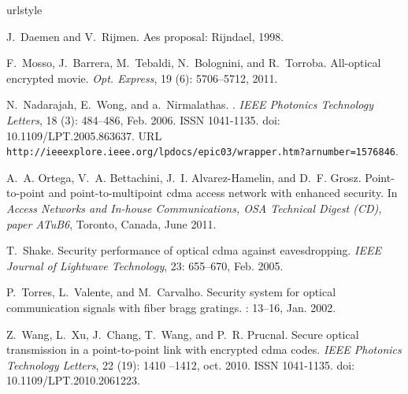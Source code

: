 \documentclass[aspectratio=169]{beamer}
\begin{document}

\footnotesize

\begin{thebibliography}{7}


\providecommand{\natexlab}[1]{#1}
\providecommand{\url}[1]{\texttt{#1}}
\expandafter\ifx\csname urlstyle\endcsname\relax
  \providecommand{\doi}[1]{doi: #1}\else
  \providecommand{\doi}{doi: \begingroup \urlstyle{rm}\Url}\fi

 J.~Daemen and V.~Rijmen.
\newblock Aes proposal: Rijndael, 1998.

F.~Mosso, J.~Barrera, M.~Tebaldi, N.~Bolognini, and R.~Torroba.
\newblock All-optical encrypted movie.
\newblock \emph{Opt. Express}, 19 (6): 5706--5712, 2011.

N.~Nadarajah, E.~Wong, and a.~Nirmalathas.
.
\newblock \emph{IEEE Photonics Technology Letters}, 18 (3):
  484--486, Feb. 2006.
\newblock ISSN 1041-1135.
\newblock \doi{10.1109/LPT.2005.863637}.
\newblock URL
  \url{http://ieeexplore.ieee.org/lpdocs/epic03/wrapper.htm?arnumber=1576846}.

A.~A. Ortega, V.~A. Bettachini, J.~I. Alvarez-Hamelin, and D.~F. Grosz.
\newblock Point-to-point and point-to-multipoint cdma access network with
  enhanced security.
\newblock In \emph{Access Networks and In-house Communications, OSA Technical
  Digest (CD), paper ATuB6}, Toronto, Canada, June 2011.

T.~Shake.
\newblock Security performance of optical cdma against eavesdropping.
\newblock \emph{IEEE Journal of Lightwave Technology}, 23: 655--670,
  Feb. 2005.

P.~Torres, L.~Valente, and M.~Carvalho.
\newblock Security system for optical communication signals with fiber bragg
  gratings.
: 13--16, Jan. 2002.

Z.~Wang, L.~Xu, J.~Chang, T.~Wang, and P.~R. Prucnal.
\newblock Secure optical transmission in a point-to-point link with encrypted
  cdma codes.
\newblock \emph{IEEE Photonics Technology Letters}, 22 (19):
  1410 --1412, oct. 2010.
\newblock ISSN 1041-1135.
\newblock \doi{10.1109/LPT.2010.2061223}.

\end{thebibliography}
\end{document}
